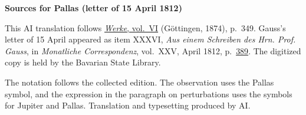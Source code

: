 \clearpage\thispagestyle{empty}
\begin{center}\textbf{Sources for Pallas (letter of 15 April 1812)}\end{center}
\noindent This AI translation follows \href{https://gdz.sub.uni-goettingen.de/id/PPN236007467}{\textit{Werke}, vol.~VI} (Göttingen, 1874), p.~349. Gauss’s letter of 15 April appeared as item XXXVI, \textit{Aus einem Schreiben des Hrn. Prof. Gauss}, in \textit{Monatliche Correspondenz}, vol.~XXV, April 1812, p.~\href{https://api.digitale-sammlungen.de/iiif/image/v2/bsb10538614_00403/full/1600,/0/default.jpg}{389}. The digitized copy is held by the Bavarian State Library.
\par\smallskip\noindent The notation follows the collected edition. The observation uses the Pallas symbol, and the expression in the paragraph on perturbations uses the symbols for Jupiter and Pallas. Translation and typesetting produced by AI.
\clearpage
